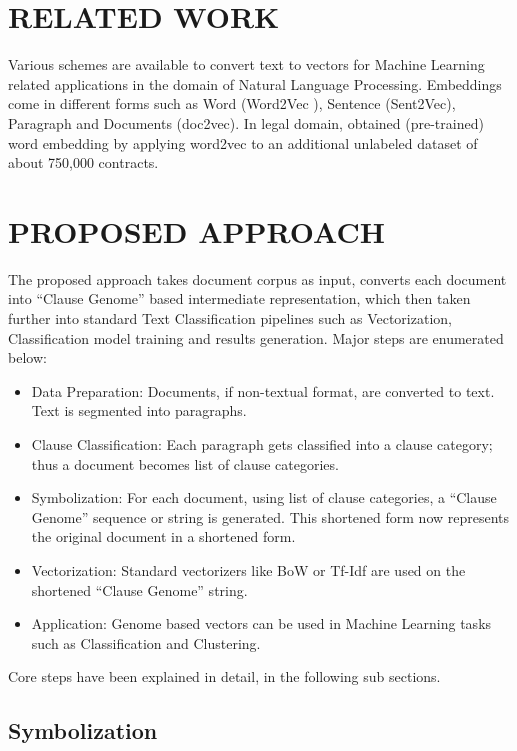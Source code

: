 \documentclass[journal]{journal}
\begin{document}
\section{RELATED WORK}
\label{sec:litsurvey}
Various schemes are available to convert text to vectors for Machine Learning related applications in the domain of Natural Language Processing. Embeddings come in different forms such as Word  (Word2Vec \cite{mikolov2013distributed}), Sentence (Sent2Vec), Paragraph and Documents (doc2vec). In legal domain, \cite{Chalkidis2017} obtained (pre-trained) word embedding by applying word2vec to an additional unlabeled dataset of about 750,000 contracts.

\section{PROPOSED APPROACH}
\label{sec:proposal}

The proposed approach takes document corpus as input, converts each document into ``Clause Genome'' based intermediate representation, which then taken further into standard Text Classification pipelines such as Vectorization, Classification model training and results generation. Major steps are enumerated below:

 \begin{itemize}
 \item Data Preparation: Documents, if non-textual format, are converted to text. Text is segmented into paragraphs.
  \item Clause Classification: Each paragraph gets classified into a clause category; thus a document becomes list of clause categories.
\item Symbolization: For each document, using list of clause categories, a ``Clause Genome'' sequence or string is generated. This shortened form now represents the original document in a shortened form.
\item Vectorization: Standard vectorizers like BoW or Tf-Idf are used on the shortened ``Clause Genome'' string.
\item Application: Genome based vectors can be used in Machine Learning tasks such as Classification and Clustering.
 \end{itemize}

Core steps have been explained in detail, in the following sub sections.

\subsection{Symbolization}
\label{subsec:symbolization}
\end{document}
